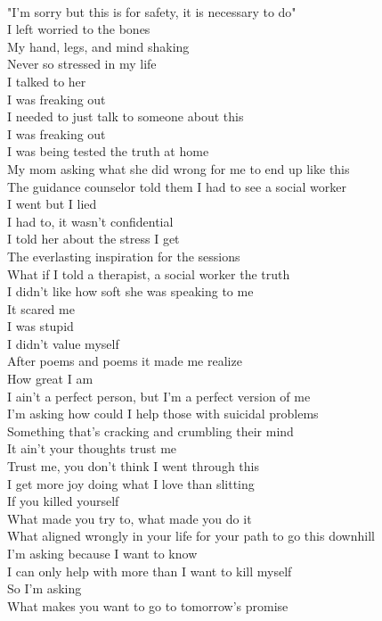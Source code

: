 \documentclass[12pt, b5paper, oneside]{book}
\begin{document}
\\"I'm sorry but this is for safety, it is necessary to do"
\\I left worried to the bones
\\My hand, legs, and mind shaking
\\Never so stressed in my life
\\I talked to her
\\I was freaking out
\\I needed to just talk to someone about this
\\I was freaking out
\\I was being tested the truth at home
\\My mom asking what she did wrong for me to end up like this
\\The guidance counselor told them I had to see a social worker
\\I went but I lied
\\I had to, it wasn't confidential
\\I told her about the stress I get
\\The everlasting inspiration for the sessions
\\What if I told a therapist, a social worker the truth
\\I didn't like how soft she was speaking to me
\\It scared me
\\I was stupid
\\I didn't value myself
\\After poems and poems it made me realize
\\How great I am
\\I ain't a perfect person, but I'm a perfect version of me
\\I'm asking how could I help those with suicidal problems
\\Something that's cracking and crumbling their mind
\\It ain't your thoughts trust me
\\Trust me, you don't think I went through this
\\I get more joy doing what I love than slitting
\\If you killed yourself
\\What made you try to,  what made you do it
\\What aligned wrongly in your life for your path to go this downhill
\\I'm asking because I want to know
\\I can only help with more than I want to kill myself
\\So I'm asking
\\What makes you want to go to tomorrow's promise 
\newpage
\end{document}

